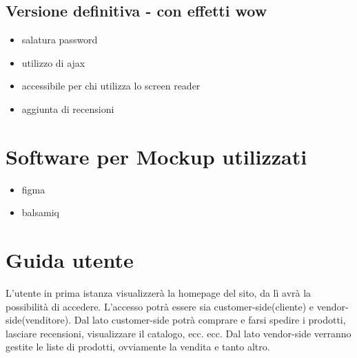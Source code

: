 \documentclass[a4paper,12pt]{report}
\begin{document}
	\subsection{Versione definitiva - con effetti wow}
	\begin{itemize}
		\item salatura password
		\item utilizzo di ajax
		\item accessibile per chi utilizza lo screen reader
		\item aggiunta di recensioni 
	\end{itemize}
	\section{Software per Mockup utilizzati}
	\begin{itemize}
		\item figma
		\item balsamiq
	\end{itemize}
	\section{Guida utente}
	L'utente in prima istanza visualizzerà la homepage del sito, da lì avrà la possibilità di accedere.
	L'accesso potrà essere sia customer-side(cliente) e vendor-side(venditore).
	Dal lato customer-side potrà comprare e farsi spedire i prodotti, lasciare recensioni, visualizzare il catalogo, ecc. ecc.
	Dal lato vendor-side verranno gestite le liste di prodotti, ovviamente la vendita e tanto altro.
\end{document}
